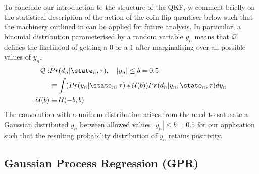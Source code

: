 To conclude our introduction to the structure of the QKF, w comment briefly on the statistical description of the action of the coin-flip quantiser below such that the machinery outlined in \cite{karlsson2005} can be applied for future analysis. In particular, a binomial distribution parameterised by a random variable $y_n$ means that $\mathcal{Q}$ defines the likelihood of getting a $0$ or a $1$ after marginalising over all possible values of $y_n$.  
\begin{align}
\mathcal{Q}: & Pr(d_n | \state_{n}, \tau), \quad |y_n| \leq b = 0.5\\
& \equiv  \int (Pr(y_n | \state_{n}, \tau) * \mathcal{U}(b) ) Pr(d_n | y_n, \state_{n}, \tau) dy_n \\
\mathcal{U}(b) & \equiv \mathcal{U}(-b, b)
\end{align}
The convolution with a uniform distribution arises from the need to saturate a Gaussian distributed  $y_n$ between allowed values $|y_n| \leq b = 0.5$ for our application such that the resulting probability distribution of $y_n$ retains positivity. 





\subsection{Gaussian Process Regression (GPR)}

